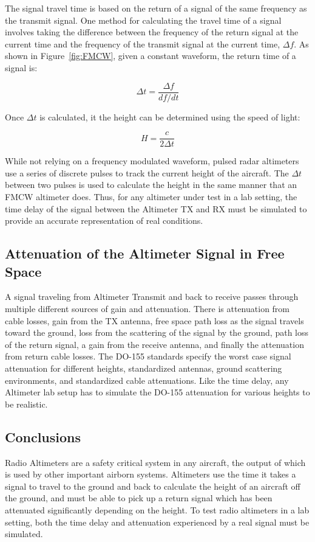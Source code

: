 The signal travel time is based on the return of a signal of the same frequency as the transmit signal. One method for calculating the travel time of a signal involves taking the difference between the frequency of the return signal at the current time and the frequency of the transmit signal at the current time, $\Delta f$. As shown in Figure~\ref{fig:FMCW}, given a constant waveform, the return time of a signal is:

$$\Delta t = \frac{\Delta f}{df/dt}$$

Once $\Delta t$ is calculated, it the height can be determined using the speed of light: 

$$H = \frac{c}{2\Delta t} $$

While not relying on a frequency modulated waveform, pulsed radar altimeters use a series of discrete pulses to track the current height of the aircraft. The $\Delta t$ between two pulses is used to calculate the height in the same manner that an FMCW altimeter does. Thus, for any altimeter under test in a lab setting, the time delay of the signal between the Altimeter TX and RX must be simulated to provide an accurate representation of real conditions. 
\subsection{Attenuation of the Altimeter Signal in Free Space}
A signal traveling from Altimeter Transmit and back to receive passes through multiple different sources of gain and attenuation. There is attenuation from cable losses, gain from the TX antenna, free space path loss as the signal travels toward the ground, loss from the scattering of the signal by the ground, path loss of the return signal, a gain from the receive antenna, and finally the attenuation from return cable losses. The DO-155 standards specify the worst case signal attenuation for different heights, standardized antennas,   ground scattering environments, and standardized cable attenuations. Like the time delay, any Altimeter lab setup has to simulate the DO-155 attenuation for various heights to be realistic. 
\subsection{Conclusions}
Radio Altimeters are a safety critical system in any aircraft, the output of which is used by other important airborn systems. Altimeters use the time it takes a signal to travel to the ground and back to calculate the height of an aircraft off the ground, and must be able to pick up a return signal which has been attenuated significantly depending on the height. To test radio altimeters in a lab setting, both the time delay and attenuation experienced by a real signal must be simulated. 
